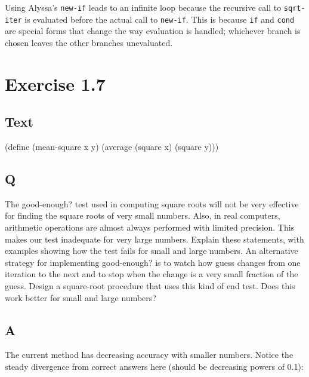 \documentclass[
]{article}
\newenvironment{Shaded}{}{}
\newcommand{\ExtensionTok}[1]{#1}
\newcommand{\FunctionTok}[1]{\textcolor[rgb]{0.02,0.16,0.49}{#1}}
\newcommand{\NormalTok}[1]{#1}
\begin{document}
Using Alyssa's \texttt{new-if} leads to an infinite loop because the
recursive call to \texttt{sqrt-iter} is evaluated before the actual call
to \texttt{new-if}. This is because \texttt{if} and \texttt{cond} are
special forms that change the way evaluation is handled; whichever
branch is chosen leaves the other branches unevaluated.

\hypertarget{exercise-1.7}{%
\section{Exercise 1.7}\label{exercise-1.7}}

\hypertarget{text-1}{%
\subsection{Text}\label{text-1}}

\hypertarget{mean-square}{%
\label{mean-square}}%
\begin{Shaded}
\begin{Highlighting}[numbers=left,,]
\NormalTok{(}\ExtensionTok{define}\FunctionTok{ }\NormalTok{(mean{-}square x y)}
\NormalTok{  (average (square x) (square y)))}
\end{Highlighting}
\end{Shaded}

\hypertarget{q-6}{%
\subsection{Q}\label{q-6}}

The good-enough? test used in computing square roots will not be very
effective for finding the square roots of very small numbers. Also, in
real computers, arithmetic operations are almost always performed with
limited precision. This makes our test inadequate for very large
numbers. Explain these statements, with examples showing how the test
fails for small and large numbers. An alternative strategy for
implementing good-enough? is to watch how guess changes from one
iteration to the next and to stop when the change is a very small
fraction of the guess. Design a square-root procedure that uses this
kind of end test. Does this work better for small and large numbers?

\hypertarget{a-6}{%
\subsection{A}\label{a-6}}

The current method has decreasing accuracy with smaller numbers. Notice
the steady divergence from correct answers here (should be decreasing
powers of 0.1):
\end{document}
